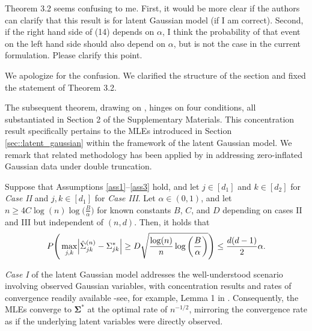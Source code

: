 \begin{point}
    Theorem 3.2 seems confusing to me. First, it would be more clear if the authors can clarify that this result is for latent Gaussian model (if I am correct). Second, if the right hand side of (14) depends on \(\alpha\), I think the probability of that event on the left hand side should also depend on \(\alpha\), but is not the case in the current formulation. Please clarify this point.
\end{point}

\begin{reply}
    We apologize for the confusion. We clarified the structure of the section and fixed the statement of Theorem 3.2.
\end{reply}

\begin{change}
    The subsequent theorem, drawing on \citet{Mei18}, hinges on four conditions, all substantiated in Section 2 of the Supplementary Materials. This concentration result specifically pertains to the MLEs introduced in Section \ref{sec::latent_gaussian} within the framework of the latent Gaussian model. We remark that related methodology has been applied by \citet{Anne19} in addressing zero-inflated Gaussian data under double truncation.

    \begin{theorem*}
        Suppose that Assumptions \ref{ass1}--\ref{ass3} hold, and let $j \in [d_1]$ and $k \in [d_2]$ for  \textit{Case II} and $j,k \in [d_1]$ for \textit{Case III}. Let $\alpha \in (0,1)$, and let \(n \geq 4 C \log(n) \log\Big(\frac{B}{\alpha}\Big)\) for known constants $B$, $C$, and $D$ depending on cases II and III but independent of $(n,d)$. Then, it holds that
        \begin{equation*}
            P\Bigg(\max_{j,k}\abs{\hat{\Sigma}_{jk}^{(n)} - \Sigma_{jk}^{*}} \geq D\sqrt{\frac{\log(n)}{n} \log\bigg(\frac{B}{\alpha}\bigg)}\Bigg) \leq \frac{d(d-1)}{2}\alpha.
        \end{equation*}
    \end{theorem*}
    \textit{Case I} of the latent Gaussian model addresses the well-understood scenario involving observed Gaussian variables, with concentration results and rates of convergence readily available -see, for example, Lemma 1 in \citet{Ravikumar11}. Consequently, the MLEs converge to \(\mathbf{\Sigma}^{*}\) at the optimal rate of \(n^{-1/2}\), mirroring the convergence rate as if the underlying latent variables were directly observed.
\end{change}

